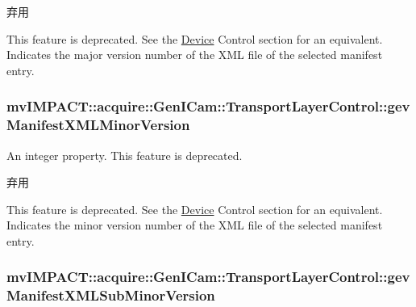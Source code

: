 \begin{DoxyRefDesc}{弃用}
\item[\hyperlink{deprecated__deprecated000087}{弃用}]This feature is deprecated. See the \hyperlink{classmv_i_m_p_a_c_t_1_1acquire_1_1_device}{Device} Control section for an equivalent. Indicates the major version number of the X\+M\+L file of the selected manifest entry. \end{DoxyRefDesc}
\hypertarget{classmv_i_m_p_a_c_t_1_1acquire_1_1_gen_i_cam_1_1_transport_layer_control_a3b3747f9635ba2c4cbb432273209b092}{
\subsubsection[{gev\+Manifest\+X\+M\+L\+Minor\+Version}]{ mv\+I\+M\+P\+A\+C\+T\+::acquire\+::\+Gen\+I\+Cam\+::\+Transport\+Layer\+Control\+::gev\+Manifest\+X\+M\+L\+Minor\+Version}}\label{classmv_i_m_p_a_c_t_1_1acquire_1_1_gen_i_cam_1_1_transport_layer_control_a3b3747f9635ba2c4cbb432273209b092}


An integer property. This feature is deprecated. 

\begin{DoxyRefDesc}{弃用}
\item[\hyperlink{deprecated__deprecated000088}{弃用}]This feature is deprecated. See the \hyperlink{classmv_i_m_p_a_c_t_1_1acquire_1_1_device}{Device} Control section for an equivalent. Indicates the minor version number of the X\+M\+L file of the selected manifest entry. \end{DoxyRefDesc}
\hypertarget{classmv_i_m_p_a_c_t_1_1acquire_1_1_gen_i_cam_1_1_transport_layer_control_aaf30f52128519238a83f09ca514fd246}{
\subsubsection[{gev\+Manifest\+X\+M\+L\+Sub\+Minor\+Version}]{ mv\+I\+M\+P\+A\+C\+T\+::acquire\+::\+Gen\+I\+Cam\+::\+Transport\+Layer\+Control\+::gev\+Manifest\+X\+M\+L\+Sub\+Minor\+Version}}\label{classmv_i_m_p_a_c_t_1_1acquire_1_1_gen_i_cam_1_1_transport_layer_control_aaf30f52128519238a83f09ca514fd246}


